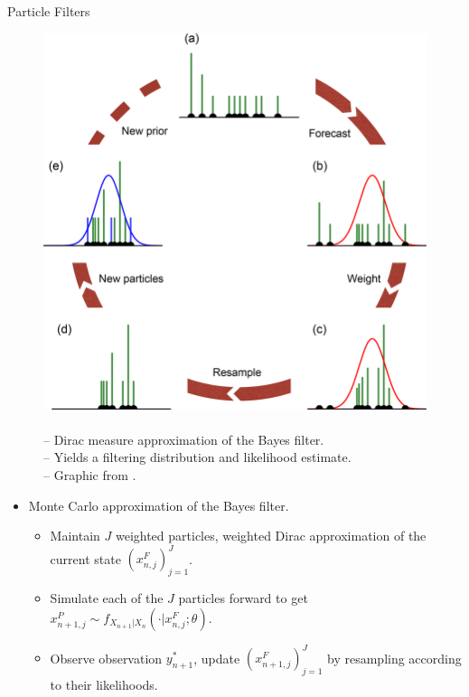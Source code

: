 \documentclass{beamer}
\begin{document}
\begin{frame}{Particle Filters}

    \begin{figure}
        \centering
        \begin{minipage}[c]{0.5\textwidth}
            \centering
            \includegraphics[scale=0.125]{imgs/pfilter.png}
            \end{minipage}
        \begin{minipage}[c]{0.45\textwidth}
            \caption{
            \\
            -- Dirac measure approximation of the Bayes filter. 
            \\ 
            -- Yields a filtering distribution and likelihood estimate.
            \\ 
            -- Graphic from \cite{berg2019pfilterimage}.}
        \end{minipage}
        \label{fig:pfilter-illustration}
    \end{figure}
    
    \begin{itemize}
        \item Monte Carlo approximation of the Bayes filter.
        \begin{itemize}
            \item \pause Maintain $J$ weighted particles, weighted Dirac approximation of the current state $(x_{n,j}^F)_{j=1}^J$. 
            \item \pause Simulate each of the $J$ particles forward to get $x_{n+1,j}^P \sim f_{X_{n+1}|X_n}(\cdot | x_{n,j}^F; \theta)$.
            \item \pause Observe observation $y_{n+1}^*$, update $(x_{n+1,j}^F)_{j=1}^J$ by resampling according to their likelihoods.
        \end{itemize}
    \end{itemize}
\end{frame}
\end{document}
